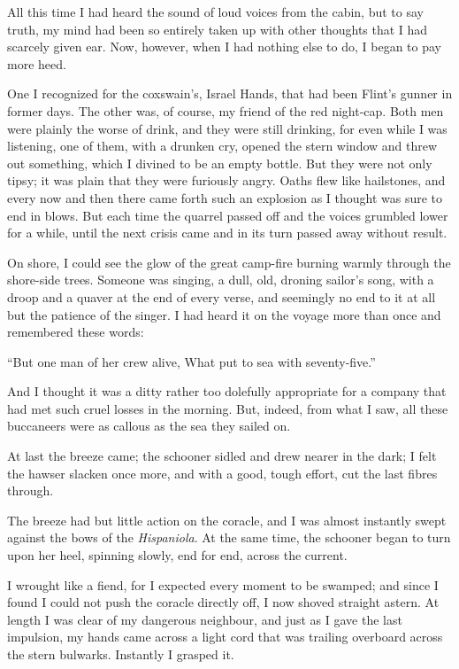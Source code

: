 All this time I had heard the sound of loud voices from the cabin, but to say truth, my mind had been so entirely taken up with other thoughts that I had scarcely given ear. Now, however, when I had nothing else to do, I began to pay more heed.

One I recognized for the coxswain’s, Israel Hands, that had been Flint’s gunner in former days. The other was, of course, my friend of the red night-cap. Both men were plainly the worse of drink, and they were still drinking, for even while I was listening, one of them, with a drunken cry, opened the stern window and threw out something, which I divined to be an empty bottle. But they were not only tipsy; it was plain that they were furiously angry. Oaths flew like hailstones, and every now and then there came forth such an explosion as I thought was sure to end in blows. But each time the quarrel passed off and the voices grumbled lower for a while, until the next crisis came and in its turn passed away without result.

On shore, I could see the glow of the great camp-fire burning warmly through the shore-side trees. Someone was singing, a dull, old, droning sailor’s song, with a droop and a quaver at the end of every verse, and seemingly no end to it at all but the patience of the singer. I had heard it on the voyage more than once and remembered these words:

\enquote{But one man of her crew alive,
What put to sea with seventy-five.}

And I thought it was a ditty rather too dolefully appropriate for a company that had met such cruel losses in the morning. But, indeed, from what I saw, all these buccaneers were as callous as the sea they sailed on.

At last the breeze came; the schooner sidled and drew nearer in the dark; I felt the hawser slacken once more, and with a good, tough effort, cut the last fibres through.

The breeze had but little action on the coracle, and I was almost instantly swept against the bows of the \textit{Hispaniola}. At the same time, the schooner began to turn upon her heel, spinning slowly, end for end, across the current.

I wrought like a fiend, for I expected every moment to be swamped; and since I found I could not push the coracle directly off, I now shoved straight astern. At length I was clear of my dangerous neighbour, and just as I gave the last impulsion, my hands came across a light cord that was trailing overboard across the stern bulwarks. Instantly I grasped it.

